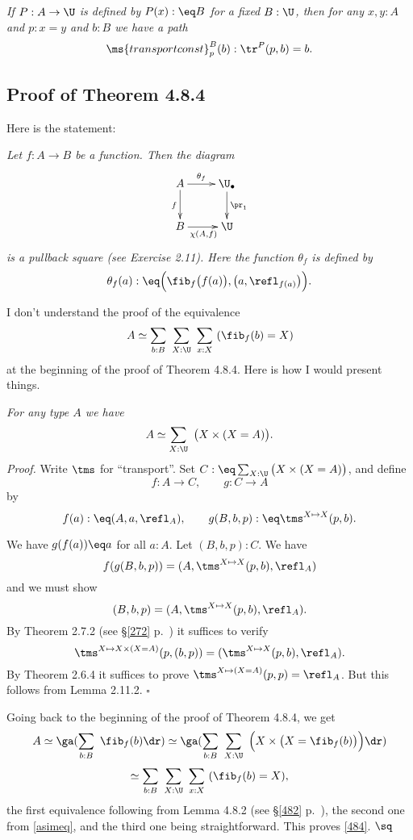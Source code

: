 \documentclass[12pt]{article}
\begin{document}
\nn{} \emph{If $P:A\to\U$ is defined by $P(x):\eq B$ for a fixed $B:\U$, then for any $x,y:A$ and $p:x=y$ and $b:B$ we have a path}
$$
\ms{transportconst}^B_p(b):\tr^P(p,b)=b.
$$


\subsection{Proof of Theorem 4.8.4}

Here is the statement:

\nn\emph{Let $f:A\to B$ be a function. Then the diagram
$$
\xymatrix{
A\ar[r]^-{\theta_f}\ar[d]_{f}&\U_\bullet\ar[d]^{\pr_1}\\
B\ar[r]_{\chi(A,f)} &\U}
$$ 
is a pullback square (see Exercise 2.11). Here the function $\theta_f$ is defined by}
$$
\theta_f(a):\eq\Big(\fib_f\big(f(a)\big),\big(a,\refl_{f(a)}\big)\Big).
$$

I don't understand the proof of the equivalence 
\begin{equation}\label{484}
A\simeq\sum_{b:B}\ \sum_{X:\U}\ \sum_{x:X}\ (\fib_f(b)=X)
\end{equation}
at the beginning of the proof of Theorem 4.8.4. Here is how I would present things. 

\nn{} \emph{For any type $A$ we have} 
\begin{equation}\label{asimeq}
A\simeq\sum_{X:\U}\ \big(X\times(X=A)\big).
\end{equation}
\emph{Proof.} Write $\tms$ for ``transport''. Set $C:\eq\sum_{X:\U}\big(X\times(X=A)\big)$, and define 
$$
f:A\to C,\qquad g:C\to A
$$ 
by 
$$
f(a):\eq(A,a,\refl_A),\qquad g(B,b,p):\eq\tms^{X\mapsto X}(p,b).
$$ 

\nn We have $g(f(a))\eq a$ for all $a:A$. Let $(B,b,p):C$. We have 
$$
f(g(B,b,p))=(A,\tms^{X\mapsto X}(p,b),\refl_A)
$$ 
and we must show 
$$
(B,b,p)=(A,\tms^{X\mapsto X}(p,b),\refl_A).
$$
By Theorem 2.7.2 (see \S\ref{272} p.~\pageref{272}) it suffices to verify 
$$
\tms^{X\mapsto X\times(X=A)}(p,(b,p))=(\tms^{X\mapsto X}(p,b),\refl_A).
$$ 
By Theorem 2.6.4 it suffices to prove $\tms^{X\mapsto(X=A)}(p,p)=\refl_A$. But this follows from Lemma 2.11.2. $\square$

Going back to the beginning of the proof of Theorem 4.8.4, we get 
$$
A\simeq\ga(\sum_{b:B}\ \fib_f(b)\dr)\simeq\ga(\sum_{b:B}\ \sum_{X:\U}\ \Big(X\times\big(X=\fib_f(b)\big)\Big)\dr)
$$
$$
\simeq\sum_{b:B}\ \sum_{X:\U}\ \sum_{x:X}\ (\fib_f(b)=X),
$$ 
the first equivalence following from Lemma 4.8.2 (see \S\ref{482} p.~\pageref{482}), the second one from \eqref{asimeq}, and the third one being straightforward. This proves \eqref{484}. $\sq$
\end{document}
